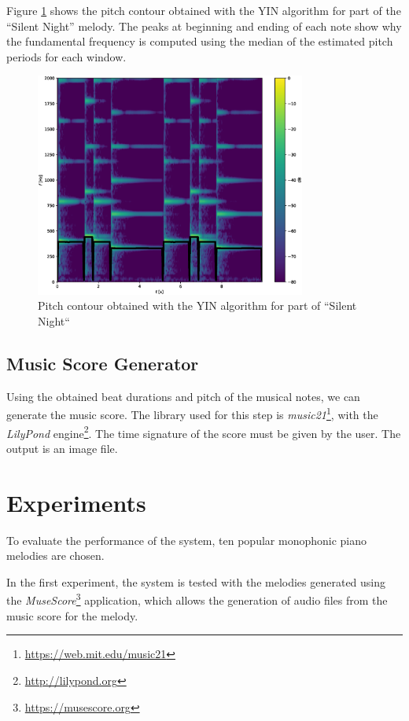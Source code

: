 \documentclass[conference]{IEEEtran}
\begin{document}
Figure \ref{fig_pitch} shows the pitch contour obtained with the YIN algorithm for part of the ``Silent Night'' melody.
The peaks at beginning and ending of each note show why the fundamental frequency is computed using the median of the estimated pitch periods for each window.

\begin{figure}[bt]
\centering
\vspace{-10pt}
\includegraphics[clip, width=3.5in]{pitch}
\caption{Pitch contour obtained with the YIN algorithm for part of ``Silent Night``}
\label{fig_pitch}
\vspace{+2pt}
\end{figure}

\subsection{Music Score Generator}

Using the obtained beat durations and pitch of the musical notes, we can generate the music score.
The library used for this step is \emph{music21}\footnote{\url{https://web.mit.edu/music21}}, with the \emph{LilyPond} engine\footnote{\url{http://lilypond.org}}.
The time signature of the score must be given by the user.
The output is an image file.

\section{Experiments}

To evaluate the performance of the system, ten popular monophonic piano melodies are chosen.

In the first experiment, the system is tested with the melodies generated using the \emph{MuseScore}\footnote{\url{https://musescore.org}} application, which allows the generation of audio files from the music score for the melody.
\end{document}
